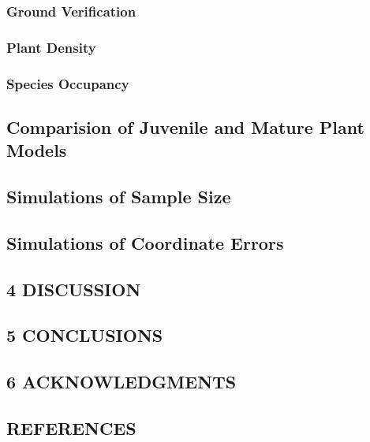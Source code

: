 \documentclass[
]{article}
\begin{document}
\subsubsection{Ground Verification}\label{ground-verification-1}

\subsubsection{Plant Density}\label{plant-density-1}

\subsubsection{Species Occupancy}\label{species-occupancy-1}

\subsection{Comparision of Juvenile and Mature Plant
Models}\label{comparision-of-juvenile-and-mature-plant-models-1}

\subsection{Simulations of Sample
Size}\label{simulations-of-sample-size-1}

\subsection{Simulations of Coordinate
Errors}\label{simulations-of-coordinate-errors-1}

\subsection{4 \textbar{} DISCUSSION}\label{discussion}

\subsection{5 \textbar{} CONCLUSIONS}\label{conclusions}

\subsection{6 \textbar{} ACKNOWLEDGMENTS}\label{acknowledgments}

\subsection*{REFERENCES}\label{references}
\end{document}
